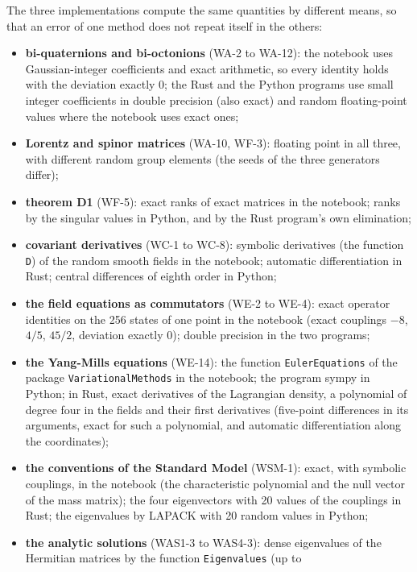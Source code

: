 \documentclass[
  10pt,
]{article}
\begin{document}
The three implementations compute the same quantities by different
means, so that an error of one method does not repeat itself in the
others:

\begin{itemize}
\item
  \textbf{bi-quaternions and bi-octonions} (WA-2 to WA-12): the notebook
  uses Gaussian-integer coefficients and exact arithmetic, so every
  identity holds with the deviation exactly 0; the Rust and the Python
  programs use small integer coefficients in double precision (also
  exact) and random floating-point values where the notebook uses exact
  ones;
\item
  \textbf{Lorentz and spinor matrices} (WA-10, WF-3): floating point in
  all three, with different random group elements (the seeds of the
  three generators differ);
\item
  \textbf{theorem D1} (WF-5): exact ranks of exact matrices in the
  notebook; ranks by the singular values in Python, and by the Rust
  program's own elimination;
\item
  \textbf{covariant derivatives} (WC-1 to WC-8): symbolic derivatives
  (the function \texttt{D}) of the random smooth fields in the notebook;
  automatic differentiation in Rust; central differences of eighth order
  in Python;
\item
  \textbf{the field equations as commutators} (WE-2 to WE-4): exact
  operator identities on the 256 states of one point in the notebook
  (exact couplings \(-8\), \(4/5\), \(45/2\), deviation exactly 0);
  double precision in the two programs;
\item
  \textbf{the Yang-Mills equations} (WE-14): the function
  \texttt{EulerEquations} of the package \texttt{VariationalMethods} in
  the notebook; the program sympy in Python; in Rust, exact derivatives
  of the Lagrangian density, a polynomial of degree four in the fields
  and their first derivatives (five-point differences in its arguments,
  exact for such a polynomial, and automatic differentiation along the
  coordinates);
\item
  \textbf{the conventions of the Standard Model} (WSM-1): exact, with
  symbolic couplings, in the notebook (the characteristic polynomial and
  the null vector of the mass matrix); the four eigenvectors with 20
  values of the couplings in Rust; the eigenvalues by LAPACK with 20
  random values in Python;
\item
  \textbf{the analytic solutions} (WAS1-3 to WAS4-3): dense eigenvalues
  of the Hermitian matrices by the function \texttt{Eigenvalues} (up to

\end{itemize}
\end{document}
